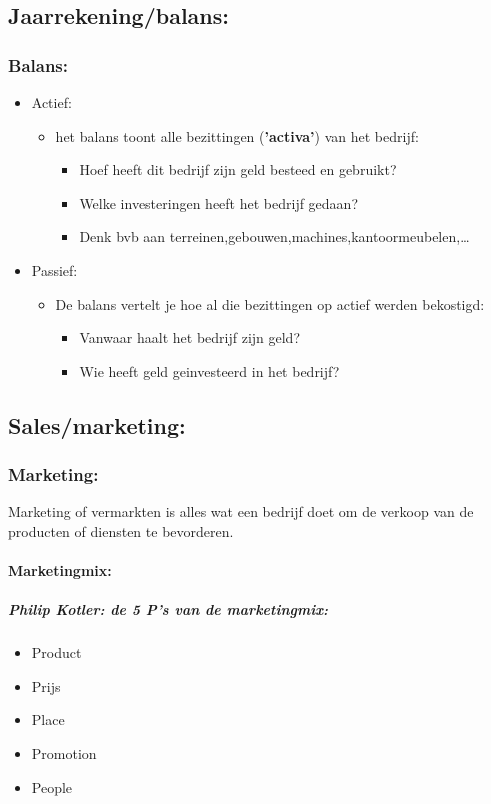 \documentclass[12pt]{article}
\begin{document}
\subsection{Jaarrekening/balans:}
\subsubsection{Balans:}
\begin{itemize}
    \item Actief:\begin{itemize}
        \item het balans toont alle bezittingen (\textbf{'activa'}) van het bedrijf:\begin{itemize}
            \item Hoef heeft dit bedrijf zijn geld besteed en gebruikt?
            \item Welke investeringen heeft het bedrijf gedaan?
            \item Denk bvb aan terreinen,gebouwen,machines,kantoormeubelen,\dots
        \end{itemize}
    \end{itemize}
    \item Passief:\begin{itemize}
        \item De balans vertelt je hoe al die bezittingen op actief werden bekostigd:\begin{itemize}
            \item Vanwaar haalt het bedrijf zijn geld?
            \item Wie heeft geld geinvesteerd in het bedrijf?
        \end{itemize}
    \end{itemize}
\end{itemize}
\subsection{Sales/marketing:}
\subsubsection{Marketing:}
Marketing of vermarkten is alles wat een bedrijf doet om de verkoop van de producten of diensten te bevorderen.
\paragraph{Marketingmix:}
\subparagraph{Philip Kotler: de 5 P's van de marketingmix:}\begin{itemize}
    \item Product 
    \item Prijs
    \item Place
    \item Promotion
    \item People
\end{itemize}
\end{document}
